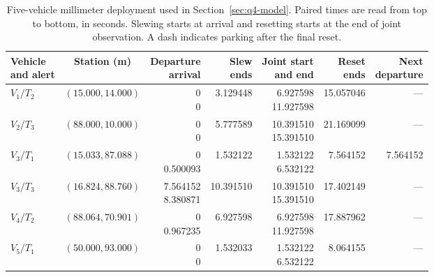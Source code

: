 \documentclass{swmcmthesis}
\begin{document}
\begin{table}[!htbp]
    \centering
    \caption{Five-vehicle millimeter deployment used in Section~\ref{sec:q4-model}. Paired times are read from top to bottom, in seconds. Slewing starts at arrival and resetting starts at the end of joint observation. A dash indicates parking after the final reset.}
    \label{tab:q22-millimeter}
    \setlength{\tabcolsep}{3pt}
    \begin{tabular}{@{}lcrrrrr@{}}
        \toprule
        \shortstack[l]{Vehicle\\and alert} & Station (m) & \shortstack[r]{Departure\\arrival}
            & \shortstack[r]{Slew\\ends} & \shortstack[r]{Joint start\\and end}
            & \shortstack[r]{Reset\\ends} & \shortstack[r]{Next\\departure} \\
        \midrule
        \(V_1/T_2\) & \((15.000,14.000)\) & \shortstack[r]{0\\0} & 3.129448
            & \shortstack[r]{6.927598\\11.927598} & 15.057046 & --- \\
        \(V_2/T_3\) & \((88.000,10.000)\) & \shortstack[r]{0\\0} & 5.777589
            & \shortstack[r]{10.391510\\15.391510} & 21.169099 & --- \\
        \(V_3/T_1\) & \((15.033,87.088)\) & \shortstack[r]{0\\0.500093} & 1.532122
            & \shortstack[r]{1.532122\\6.532122} & 7.564152 & 7.564152 \\
        \(V_3/T_3\) & \((16.824,88.760)\) & \shortstack[r]{7.564152\\8.380871} & 10.391510
            & \shortstack[r]{10.391510\\15.391510} & 17.402149 & --- \\
        \(V_4/T_2\) & \((88.064,70.901)\) & \shortstack[r]{0\\0.967235} & 6.927598
            & \shortstack[r]{6.927598\\11.927598} & 17.887962 & --- \\
        \(V_5/T_1\) & \((50.000,93.000)\) & \shortstack[r]{0\\0} & 1.532033
            & \shortstack[r]{1.532122\\6.532122} & 8.064155 & --- \\
        \bottomrule
    \end{tabular}
\end{table}
\end{document}
